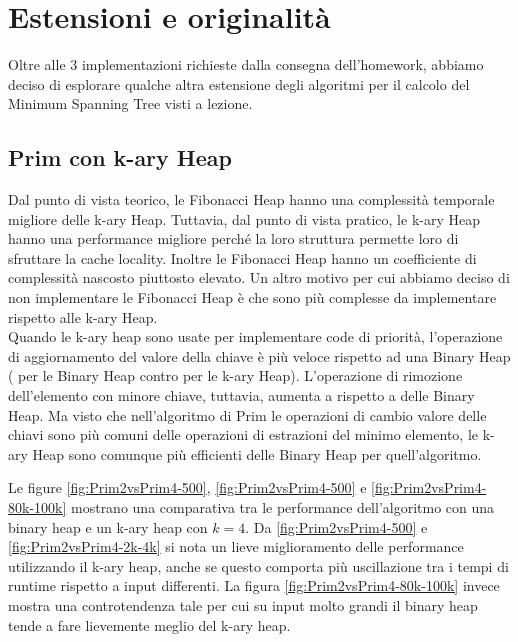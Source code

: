 \section{Estensioni e originalità}
\label{cap:extensions-and-originalities}

Oltre alle 3 implementazioni richieste dalla consegna dell'homework, abbiamo deciso di esplorare qualche altra estensione degli algoritmi per il calcolo del Minimum Spanning Tree visti a lezione.

\subsection{Prim con k-ary Heap}


Dal punto di vista teorico, le Fibonacci Heap hanno una complessità temporale migliore delle k-ary Heap.
Tuttavia, dal punto di vista pratico, le k-ary Heap hanno una performance migliore perché la loro struttura permette loro di sfruttare la cache locality. Inoltre le Fibonacci Heap hanno un coefficiente di complessità nascosto piuttosto elevato.
Un altro motivo per cui abbiamo deciso di non implementare le Fibonacci Heap è che sono più complesse da implementare rispetto alle k-ary Heap. \\

\noindent Quando le k-ary heap sono usate per implementare code di priorità, l'operazione di aggiornamento del valore della chiave è più veloce rispetto ad una Binary Heap (\complexityLogN{} per le Binary Heap contro \complexityLogkN{} per le k-ary Heap).
L'operazione di rimozione dell'elemento con minore chiave, tuttavia, aumenta a \complexityKLogkN{} rispetto a \complexityLogkN{} delle Binary Heap. Ma visto che nell'algoritmo di Prim le operazioni di cambio valore delle chiavi sono più comuni delle operazioni di estrazioni del minimo elemento, le k-ary Heap sono comunque più efficienti delle Binary Heap per quell'algoritmo.

\noindent Le figure \ref{fig:Prim2vsPrim4-500}, \ref{fig:Prim2vsPrim4-500} e \ref{fig:Prim2vsPrim4-80k-100k} mostrano una comparativa tra le performance
dell'algoritmo con una binary heap e un k-ary heap con $k = 4$. 
Da \ref{fig:Prim2vsPrim4-500} e \ref{fig:Prim2vsPrim4-2k-4k} si nota un lieve miglioramento delle performance utilizzando il k-ary heap, anche 
se questo comporta più uscillazione tra i tempi di runtime rispetto a input differenti. La figura \ref{fig:Prim2vsPrim4-80k-100k} invece mostra
una controtendenza tale per cui su input molto grandi il binary heap tende a fare lievemente meglio del k-ary heap.

